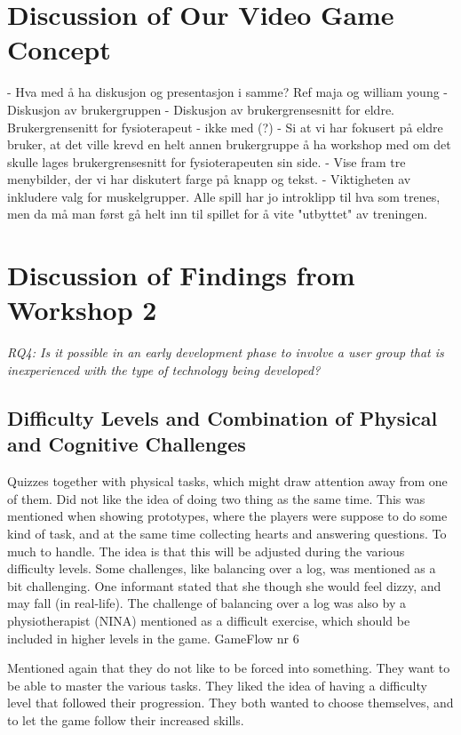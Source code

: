 \section{Discussion of Our Video Game Concept}
- Hva med å ha diskusjon og presentasjon i samme? Ref maja og william young
- Diskusjon av brukergruppen
- Diskusjon av brukergrensesnitt for eldre. Brukergrensenitt for fysioterapeut - ikke med (?)
- Si at vi har fokusert på eldre bruker, at det ville krevd en helt annen brukergruppe å ha workshop med om det skulle lages brukergrensesnitt for fysioterapeuten sin side.
- Vise fram tre menybilder, der vi har diskutert farge på knapp og tekst. 
- Viktigheten av inkludere valg for muskelgrupper. Alle spill har jo introklipp til hva som trenes, men da må man først gå helt inn til spillet for å vite "utbyttet" av treningen.

\section{Discussion of Findings from Workshop 2}
\emph{RQ4: Is it possible in an early development phase to involve a user group that is inexperienced with the type of technology being developed?}

\subsection{Difficulty Levels and Combination of Physical and Cognitive Challenges}
Quizzes together with physical tasks, which might draw attention away from one of them. Did not like the idea of doing two thing as the same time. This was mentioned when showing prototypes, where the players were suppose to do some kind of task, and at the same time collecting hearts and answering questions. To much to handle. The idea is that this will be adjusted during the various difficulty levels. Some challenges, like balancing over a log, was mentioned as a bit challenging. One informant stated that she though she would feel dizzy, and may fall (in real-life). The challenge of balancing over a log was also by a physiotherapist (NINA) mentioned as a difficult exercise, which should be included in higher levels in the game. 
GameFlow nr 6

Mentioned again that they do not like to be forced into something. They want to be able to master the various tasks. They liked the idea of having a difficulty level that followed their progression. They both wanted to choose themselves, and to let the game follow their increased skills. 

